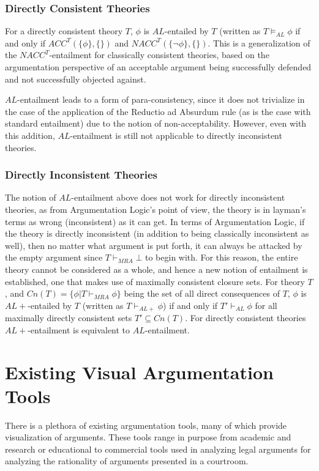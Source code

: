 \documentclass[11pt,twoside,a4paper]{report}
\begin{document}
\subsubsection{Directly Consistent Theories}
For a directly consistent theory $T$, $\phi$ is $AL$-entailed by $T$ (written as $T\models_{AL}\phi$ if and only if $ACC^T(\{\phi\},\{\})$ and $NACC^T(\{\neg\phi\},\{\})$. This is a generalization of the $NACC^T$-entailment for classically consistent theories, based on the argumentation perspective of an acceptable argument being successfully defended and not successfully objected against.

$AL$-entailment leads to a form of para-consistency, since it does not trivialize in the case of the application of the Reductio ad Absurdum rule (as is the case with standard entailment) due to the notion of non-acceptability. However, even with this addition, $AL$-entailment is still not applicable to directly inconsistent theories.

\subsubsection{Directly Inconsistent Theories}
The notion of $AL$-entailment above does not work for directly inconsistent theories, as from Argumentation Logic's point of view, the theory is in layman's terms as wrong (inconsistent) as it can get. In terms of Argumentation Logic, if the theory is directly inconsistent (in addition to being classically inconsistent as well), then no matter what argument is put forth, it can always be attacked by the empty argument since $T\vdash_{MRA}\bot$ to begin with. 
For this reason, the entire theory cannot be considered as a whole, and hence a new notion of entailment is established, one that makes use of maximally consistent closure sets. For theory $T$, and $Cn(T) = \{\phi| T\vdash_{MRA}\phi\}$ being the set of all direct consequences of $T$, $\phi$ is $AL+$-entailed by $T$ (written as $T\vdash_{AL+}\phi$) if and only if $T'\vdash_{AL}\phi$ for all maximally directly consistent sets $T'\subseteq Cn(T)$. For directly consistent theories $AL+$-entailment is equivalent to $AL$-entailment. 

\section{Existing Visual Argumentation Tools}
\label{sec:vizargtools}
There is a plethora of existing argumentation tools, many of which provide visualization of arguments. These tools range in purpose from academic and research or educational to commercial tools used in analyzing legal arguments for analyzing the rationality of arguments presented in a courtroom.
\end{document}
